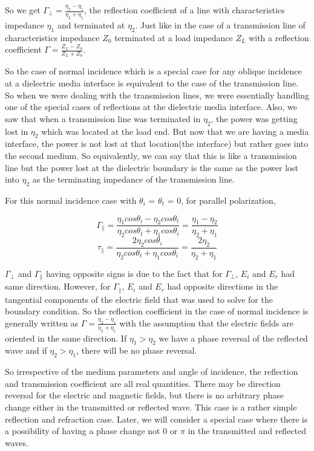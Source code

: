So we get $\Gamma_{\perp} = \frac{\eta_{2} - \eta_{1}}{\eta_{2} + \eta_{1}}$, the reflection coefficient of a line with characteristics impedance  $\eta_{1}$ and terminated at  $\eta_{2}$. Just like in the case of a transmission line of characteristics impedance $Z_{0}$ terminated at a load impedance $Z_{L}$ with a reflection coefficient $\Gamma = \frac{Z_{L} - Z_{0}}{Z_{L} + Z_{0}}$.

So the case of normal incidence which is a special case for any oblique incidence at a dielectric media interface is equivalent to the case of the transmission line. So when we were dealing with the transmission lines, we were essentially handling one of the special cases of reflections at the dielectric media interface. Also, we saw that when a transmission line was terminated in  $\eta_{2}$, the power was getting lost in  $\eta_{2}$ which was located at the load end. But now that we are having a media interface,  the power is not lost at that location(the interface) but rather goes into the second medium. So equivalently, we can say that this is like a transmission line but the power lost at the dielectric boundary is the same as the power lost into  $\eta_{2}$ as the terminating impedance of the transmission line. 

For this normal incidence case with $\theta_{i}$ = $\theta_{t}$ = 0, for parallel polarization,

\begin{dmath*}
\Gamma_{\parallel} = \frac{\eta_{1} cos\theta_{i} - \eta_{2} cos\theta_{t}}{\eta_{2} cos\theta_{t} + \eta_{1} cos\theta_{i}}
= \frac{\eta_{1} -\eta_{2}}{\eta_{2} +\eta_{1}}
\end{dmath*}
\begin{dmath*}
\tau_{\parallel} = \frac{2\eta_{2} cos\theta_{i} }{\eta_{2} cos\theta_{t} + \eta_{1} cos\theta_{i}} 
= \frac{2\eta_{2}}{\eta_{2} + \eta_{1}}
\end{dmath*}

$\Gamma_{\perp}$ and $\Gamma_{\parallel}$ having opposite signs is due to the fact that for  $\Gamma_{\perp}$, $E_{i}$ and $E_{r}$ had same direction. However, for  $\Gamma_{\parallel}$, $E_{i}$ and $E_{r}$ had opposite directions in the tangential components of the electric field that was used to solve for the boundary condition. So the reflection coefficient in the case of normal incidence is generally written as $\Gamma = \frac{\eta_{2} - \eta_{1}}{\eta_{2} + \eta_{1}}$  with the assumption that the electric fields are oriented in the same direction. If $\eta_{1}>\eta_{2}$ we have a phase reversal of the reflected wave and if $\eta_{2}>\eta_{1}$, there will be no phase reversal. 

So irrespective of the medium parameters and angle of incidence, the reflection and transmission coefficient are all real quantities. There may be direction reversal for the electric and magnetic fields,  but there is no arbitrary phase change either in the transmitted or reflected wave. This case is a rather simple reflection and refraction case. Later, we will consider a special case where there is a possibility of having a phase change not $0$ or $\pi$ in the transmitted and reflected waves.